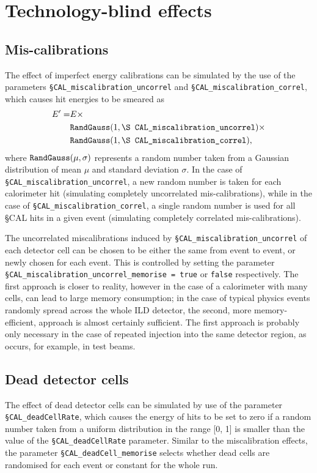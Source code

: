 \documentclass[12pt]{article} %
\begin{document}
\section{Technology-blind effects}
\label{sec:common}

\subsection{Mis-calibrations}
The effect of imperfect energy calibrations can be simulated by the use of the parameters
{\tt \S CAL\_miscalibration\_uncorrel} and {\tt \S CAL\_miscalibration\_correl}, which causes hit energies to
be smeared as
\begin{equation*}
\begin{split}
E' = & E \times \\
& \text{\tt RandGauss} ( 1, \text{\tt \S CAL\_miscalibration\_uncorrel}) \times \\
& \text{\tt RandGauss} ( 1, \text{\tt \S CAL\_miscalibration\_correl}) ,
\end{split}
\end{equation*}
where $\text{\tt RandGauss} (\mu, \sigma)$ represents a random number taken from a Gaussian distribution of mean $\mu$ and
standard deviation $\sigma$. In the case of {\tt \S CAL\_miscalibration\_uncorrel}, a new random number is taken for each
calorimeter hit (simulating completely uncorrelated mis-calibrations),
while in the case of {\tt \S CAL\_miscalibration\_correl}, a single random number is used for all \S CAL
hits in a given event (simulating completely correlated mis-calibrations).

The uncorrelated miscalibrations induced by {\tt \S CAL\_miscalibration\_uncorrel} of each detector cell can be chosen to be either
the same from event to event, or newly chosen for each event.
This is controlled by setting the parameter {\tt \S CAL\_miscalibration\_uncorrel\_memorise = true} or {\tt false} respectively.
The first approach is closer to reality, however in the case of a calorimeter with many cells, can lead to large memory consumption;
in the case of typical physics events randomly spread across the whole ILD detector, the second, more memory-efficient,
approach is almost certainly sufficient. The first approach is probably only necessary in the case of repeated injection into the same detector
region, as occurs, for example, in test beams.

\subsection{Dead detector cells}
The effect of dead detector cells can be simulated by use of the parameter {\tt \S CAL\_deadCellRate}, which causes the energy
of hits to be set to zero if a random number taken from a uniform distribution in the range [0, 1] is smaller than the
value of the {\tt \S CAL\_deadCellRate} parameter.
Similar to the miscalibration effects, the parameter {\tt \S CAL\_deadCell\_memorise} selects whether dead cells are randomised for each event or constant for the whole run.
\end{document}
